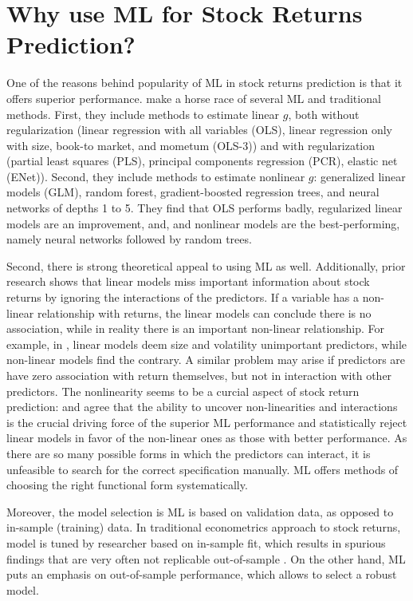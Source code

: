 				
		\section{Why use ML for Stock Returns Prediction?}
			
			One of the reasons behind popularity of ML in stock returns prediction is that it offers superior performance. \cite{gu2020empirical} make a horse race of several ML and traditional methods. First, they include methods to estimate linear $g$, both without regularization (linear regression with all variables (OLS), linear regression only with size, book-to market, and mometum (OLS-3)) and with regularization (partial least squares (PLS), principal components regression (PCR), elastic net (ENet)). Second, they include methods to estimate nonlinear $g$: generalized linear models (GLM), random forest, gradient-boosted regression trees, and neural networks of depths 1 to 5. They find that OLS performs badly, regularized linear models are an improvement, and, and nonlinear models are the best-performing, namely neural networks followed by random trees. 
			
			Second, there is strong theoretical appeal to using ML as well. Additionally, prior research shows that linear models miss important information about stock returns by ignoring the interactions of the predictors. If a variable has a non-linear relationship with returns, the linear models can conclude there is no association, while in reality there is an important non-linear relationship. For example, in \cite{gu2020empirical}, linear models deem size and volatility unimportant predictors, while non-linear models find the contrary. A similar problem may arise if predictors are have zero association with return themselves, but not in interaction with other predictors. The nonlinearity seems to be a curcial aspect of stock return prediction: \cite{bryzgalova2019forest} and \cite{gu2020empirical} agree that the ability to uncover non-linearities and interactions is the crucial driving force of the superior ML performance and \cite{gu2020empirical} statistically reject linear models in favor of the non-linear ones as those with better performance. As there are so many possible forms in which the predictors can interact, it is unfeasible to search for the correct specification manually. ML offers methods of choosing the right functional form systematically. 
			
			Moreover, the model selection is ML is based on validation data, as opposed to in-sample (training) data. In traditional econometrics approach to stock returns, model is tuned by researcher based on in-sample fit, which results in spurious findings that are very often not replicable out-of-sample \citep{mclean2016does}. On the other hand, ML puts an emphasis on out-of-sample performance, which allows to select a robust model. 	
			
